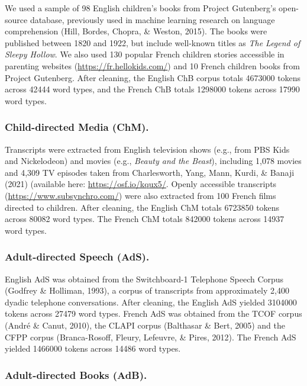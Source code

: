 \documentclass[10pt, letterpaper]{article}
\begin{document}
We used a sample of 98 English children's books from Project Gutenberg's
open-source database, previously used in machine learning research on
language comprehension (Hill, Bordes, Chopra, \& Weston, 2015). The
books were published between 1820 and 1922, but include well-known
titles as \emph{The Legend of Sleepy Hollow}. We also used 130 popular
French children stories accessible in parenting websites
(\url{https://fr.hellokids.com/}) and 10 French children books from
Project Gutenberg. After cleaning, the English ChB corpus totals 4673000
tokens across 42444 word types, and the French ChB totals 1298000 tokens
across 17990 word types.

\hypertarget{child-directed-media-chm.}{%
\subsubsection{Child-directed Media
(ChM).}\label{child-directed-media-chm.}}

Transcripts were extracted from English television shows (e.g., from PBS
Kids and Nickelodeon) and movies (e.g., \emph{Beauty and the Beast}),
including 1,078 movies and 4,309 TV episodes taken from Charlesworth,
Yang, Mann, Kurdi, \& Banaji (2021) (available here:
\url{https://osf.io/kqux5/}. Openly accessible transcripts
(\url{https://www.subsynchro.com/}) were also extracted from 100 French
films directed to children. After cleaning, the English ChM totals
6723850 tokens across 80082 word types. The French ChM totals 842000
tokens across 14937 word types.

\hypertarget{adult-directed-speech-ads.}{%
\subsubsection{Adult-directed Speech
(AdS).}\label{adult-directed-speech-ads.}}

English AdS was obtained from the Switchboard-1 Telephone Speech Corpus
(Godfrey \& Holliman, 1993), a corpus of transcripts from approximately
2,400 dyadic telephone conversations. After cleaning, the English AdS
yielded 3104000 tokens across 27479 word types. French AdS was obtained
from the TCOF corpus (André \& Canut, 2010), the CLAPI corpus (Balthasar
\& Bert, 2005) and the CFPP corpus (Branca-Rosoff, Fleury, Lefeuvre, \&
Pires, 2012). The French AdS yielded 1466000 tokens across 14486 word
types.

\hypertarget{adult-directed-books-adb.}{%
\subsubsection{Adult-directed Books
(AdB).}\label{adult-directed-books-adb.}}
\end{document}
